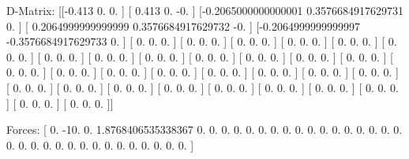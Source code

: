 D-Matrix:
[[-0.413               0.                  0.                ]
 [ 0.413               0.                 -0.                ]
 [-0.2065000000000001  0.3576684917629731  0.                ]
 [ 0.2064999999999999  0.3576684917629732 -0.                ]
 [-0.2064999999999997 -0.3576684917629733  0.                ]
 [ 0.                  0.                  0.                ]
 [ 0.                  0.                  0.                ]
 [ 0.                  0.                  0.                ]
 [ 0.                  0.                  0.                ]
 [ 0.                  0.                  0.                ]
 [ 0.                  0.                  0.                ]
 [ 0.                  0.                  0.                ]
 [ 0.                  0.                  0.                ]
 [ 0.                  0.                  0.                ]
 [ 0.                  0.                  0.                ]
 [ 0.                  0.                  0.                ]
 [ 0.                  0.                  0.                ]
 [ 0.                  0.                  0.                ]
 [ 0.                  0.                  0.                ]
 [ 0.                  0.                  0.                ]
 [ 0.                  0.                  0.                ]
 [ 0.                  0.                  0.                ]
 [ 0.                  0.                  0.                ]
 [ 0.                  0.                  0.                ]
 [ 0.                  0.                  0.                ]
 [ 0.                  0.                  0.                ]
 [ 0.                  0.                  0.                ]
 [ 0.                  0.                  0.                ]
 [ 0.                  0.                  0.                ]
 [ 0.                  0.                  0.                ]
 [ 0.                  0.                  0.                ]
 [ 0.                  0.                  0.                ]
 [ 0.                  0.                  0.                ]
 [ 0.                  0.                  0.                ]
 [ 0.                  0.                  0.                ]
 [ 0.                  0.                  0.                ]]

Forces:
[  0.                 -10.                   0.
   1.8768406535338367   0.                   0.
   0.                   0.                   0.
   0.                   0.                   0.
   0.                   0.                   0.
   0.                   0.                   0.
   0.                   0.                   0.
   0.                   0.                   0.
   0.                   0.                   0.
   0.                   0.                   0.
   0.                   0.                   0.
   0.                   0.                   0.                ]

